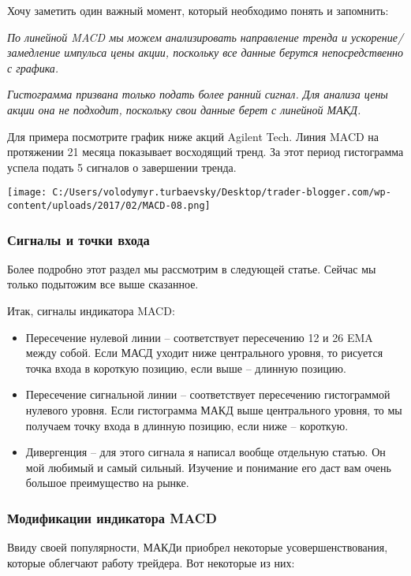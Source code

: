 \documentclass[a5paper]{article}
\begin{document}
Хочу заметить один важный момент, который необходимо понять и запомнить:

    \emph{По линейной MACD мы можем анализировать направление тренда и ускорение/замедление импульса цены акции, поскольку все данные берутся непосредственно с графика.}

    \emph{Гистограмма призвана только подать более ранний сигнал. Для анализа цены акции она не подходит, поскольку свои данные берет с линейной МАКД.}

Для примера посмотрите график ниже акций Agilent Tech. Линия MACD на протяжении 21 месяца показывает восходящий тренд. За этот период гистограмма успела подать 5 сигналов о завершении тренда.

\texttt{[image: C:/Users/volodymyr.turbaevsky/Desktop/trader-blogger.com/wp-content/uploads/2017/02/MACD-08.png]}

\subsubsection{Сигналы и точки входа}

Более подробно этот раздел мы рассмотрим в следующей статье. Сейчас мы только подытожим все выше сказанное.

Итак, сигналы индикатора MACD:
\begin{itemize}
\item     Пересечение нулевой линии – соответствует пересечению 12 и 26 EMA между собой. Если МАСД уходит ниже центрального уровня, то рисуется точка входа в короткую позицию, если выше – длинную позицию.
\item     Пересечение сигнальной линии – соответствует пересечению гистограммой нулевого уровня. Если гистограмма МАКД выше центрального уровня, то мы получаем точку входа в длинную позицию, если ниже – короткую.
\item     Дивергенция – для этого сигнала я написал вообще отдельную статью. Он мой любимый и самый сильный. Изучение и понимание его даст вам очень большое преимущество на рынке.
\end{itemize}

\subsubsection{Модификации индикатора MACD}

Ввиду своей популярности, МАКДи приобрел некоторые усовершенствования, которые облегчают работу трейдера. Вот некоторые из них:
\end{document}
